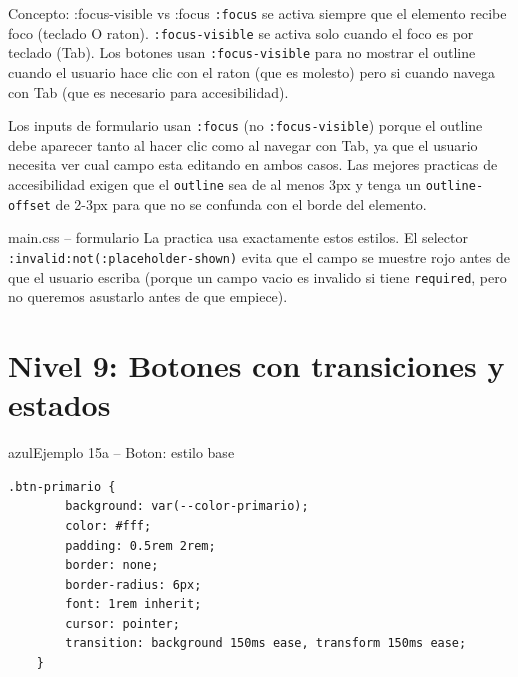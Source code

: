 \documentclass[11pt,a4paper]{article}
\begin{document}
	\begin{cajaconcepto}{Concepto: :focus-visible vs :focus}
		\texttt{:focus} se activa siempre que el elemento recibe foco (teclado O raton). \texttt{:focus-visible} se activa solo cuando el foco es por teclado (Tab). Los botones usan \texttt{:focus-visible} para no mostrar el outline cuando el usuario hace clic con el raton (que es molesto) pero si cuando navega con Tab (que es necesario para accesibilidad).
		
		Los inputs de formulario usan \texttt{:focus} (no \texttt{:focus-visible}) porque el outline debe aparecer tanto al hacer clic como al navegar con Tab, ya que el usuario necesita ver cual campo esta editando en ambos casos. Las mejores practicas de accesibilidad exigen que el \texttt{outline} sea de al menos 3px y tenga un \texttt{outline-offset} de 2-3px para que no se confunda con el borde del elemento.
	\end{cajaconcepto}
	
	\begin{cajapractica}{main.css -- formulario}
		La practica usa exactamente estos estilos. El selector \texttt{:invalid:not(:placeholder-shown)} evita que el campo se muestre rojo antes de que el usuario escriba (porque un campo vacio es invalido si tiene \texttt{required}, pero no queremos asustarlo antes de que empiece).
	\end{cajapractica}
	
	\section{Nivel 9: Botones con transiciones y estados}
	
	\begin{cajacodigo}{azul}{Ejemplo 15a -- Boton: estilo base}
		\begin{lstlisting}[style=codecss]
	.btn-primario {
		background: var(--color-primario);
		color: #fff;
		padding: 0.5rem 2rem;
		border: none;
		border-radius: 6px;
		font: 1rem inherit;
		cursor: pointer;
		transition: background 150ms ease, transform 150ms ease;
	} \end{lstlisting}
	\end{cajacodigo}
	
\end{document}
